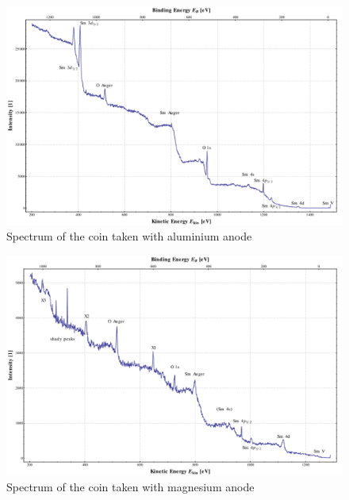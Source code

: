 \documentclass[a4paper,10pt]{scrartcl}
\begin{document}
\begin{figure}
\centering
\includegraphics[scale=0.3]{img/samarium_binding_al}
\caption{Spectrum of the coin taken with aluminium anode \label{fig:coin_al}}
\end{figure}

\begin{figure}
\centering
\includegraphics[scale=0.3]{img/samarium_binding_mg}
\caption{Spectrum of the coin taken with magnesium anode \label{fig:coin_mg}}
\end{figure}
\end{document}
